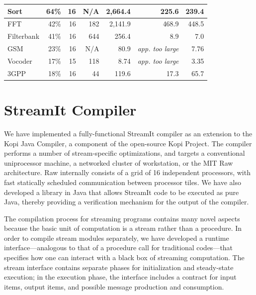 \begin{table}
\begin{tabular}{l||r|r|r|r||r||r}
Sort   & 64\% & 16  & N/A &  2,664.4 & 225.6 & 239.4 \\ \hline
FFT    & 42\% & 16  & 182 &  2,141.9 & 468.9 & 448.5  \\ \hline
Filterbank & 
       41\% & 16  &  644 &   256.4  & 8.9 & 7.0   \\ \hline
GSM    & 23\% & 16 & N/A &    80.9  & {\it app. too large} & 7.76 \\ \hline
Vocoder& 17\% & 15  & 118 &     8.74  & {\it app. too large} & 3.35  \\ \hline
3GPP   & 18\% & 16  & 44 &   119.6  & 17.3  & 65.7   \\ \hline
\end{tabular}
\end{table}

\section{StreamIt Compiler}
\label{sec:compiler}

We  have  implemented  a  fully-functional  StreamIt  compiler  as  an
extension to  the Kopi Java  Compiler, a component of  the open-source
Kopi   Project\cite{kopi}.   The   compiler  performs   a   number  of
stream-specific optimizations, and targets a conventional uniprocessor
machine,  a   networked  cluster  of  workstation,  or   the  MIT  Raw
architecture.   Raw internally consists  of a  grid of  16 independent
processors,  with  fast  statically  scheduled  communication  between
processor tiles\cite{rawshort}.   We have also developed  a library in
Java that  allows StreamIt code to  be executed as  pure Java, thereby
providing a verification mechanism for the output of the compiler.

The compilation process for streaming programs contains many novel
aspects because the basic unit of computation is a stream rather than a
procedure.  In order to compile stream modules separately, we have
developed a runtime interface---analogous to that of a procedure call for
traditional codes---that specifies how one can interact with a black box
of streaming computation.  The stream interface contains separate phases
for initialization and steady-state execution; in the execution phase,
the interface includes a contract for input items, output items, and
possible message production and consumption.

